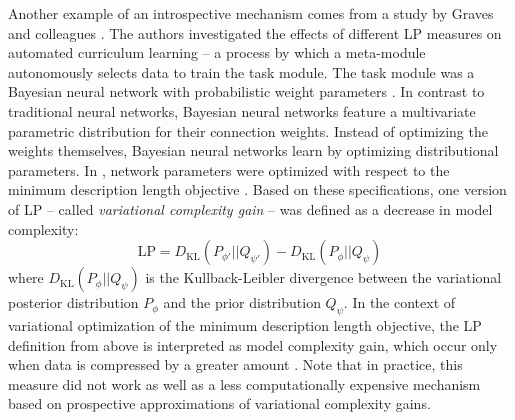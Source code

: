 Another example of an introspective mechanism comes from a study by Graves and colleagues \cite{graves_automated_2017}. The authors investigated the effects of different \ac{LP} measures on automated curriculum learning -- a process by which a meta-module autonomously selects data to train the task module. The task module was a Bayesian neural network with probabilistic weight parameters \cite{blundell_weight_2015}. In contrast to traditional neural networks, Bayesian neural networks feature a multivariate parametric distribution for their connection weights. Instead of optimizing the weights themselves, Bayesian neural networks learn by optimizing distributional parameters. In \cite{graves_automated_2017}, network parameters were optimized with respect to the minimum description length objective \cite[see][]{graves_practical_2011}. Based on these specifications, one version of \ac{LP} -- called \emph{variational complexity gain} -- was defined as a decrease in model complexity:
\begin{equation}
    \mathrm{LP} = D_{\mathrm{KL}}(P_{\phi'}||Q_{\psi'}) - D_{\mathrm{KL}}(P_{\phi}||Q_{\psi})
\end{equation}
where $D_{\mathrm{KL}}(P_{\phi}||Q_{\psi})$ is the Kullback-Leibler divergence between the variational posterior distribution $P_{\phi}$ and the prior distribution $Q_{\psi}$. In the context of variational optimization of the minimum description length objective, the \ac{LP} definition from above is interpreted as model complexity gain, which occur only when data is compressed by a greater amount \cite{graves_automated_2017}. Note that in practice, this measure did not work as well as a less computationally expensive mechanism based on prospective approximations of variational complexity gains.

